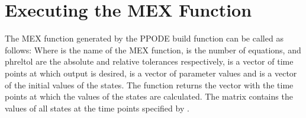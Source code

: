\section[Execution]{Executing the MEX Function}
The MEX function generated by the PPODE build function can be called as follows:
Where  is the name of the MEX function,  is the number of equations,  and ph{reltol} are the absolute and relative tolerances respectively,  is a vector of time points at which output is desired,  is a vector of parameter values and  is a vector of the initial values of the states. The function returns the vector  with the time points at which the values of the states are calculated. The matrix  contains the values of all states at the time points specified by .
